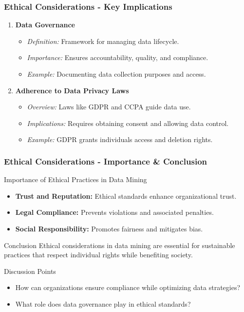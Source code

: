 \documentclass[aspectratio=169]{beamer}
\begin{document}
\begin{frame}[fragile]
    \frametitle{Ethical Considerations - Key Implications}
    \begin{enumerate}
        \item \textbf{Data Governance} 
            \begin{itemize}
                \item \textit{Definition:} Framework for managing data lifecycle.
                \item \textit{Importance:} Ensures accountability, quality, and compliance.
                \item \textit{Example:} Documenting data collection purposes and access.
            \end{itemize}
        \item \textbf{Adherence to Data Privacy Laws}
            \begin{itemize}
                \item \textit{Overview:} Laws like GDPR and CCPA guide data use.
                \item \textit{Implications:} Requires obtaining consent and allowing data control.
                \item \textit{Example:} GDPR grants individuals access and deletion rights.
            \end{itemize}
    \end{enumerate}
\end{frame}

\begin{frame}[fragile]
    \frametitle{Ethical Considerations - Importance & Conclusion}
    \begin{block}{Importance of Ethical Practices in Data Mining}
        \begin{itemize}
            \item \textbf{Trust and Reputation:} Ethical standards enhance organizational trust.
            \item \textbf{Legal Compliance:} Prevents violations and associated penalties.
            \item \textbf{Social Responsibility:} Promotes fairness and mitigates bias.
        \end{itemize}
    \end{block}
    
    \begin{block}{Conclusion}
        Ethical considerations in data mining are essential for sustainable practices that respect individual rights while benefiting society.
    \end{block}
    
    \begin{block}{Discussion Points}
        \begin{itemize}
            \item How can organizations ensure compliance while optimizing data strategies?
            \item What role does data governance play in ethical standards?
        \end{itemize}
    \end{block}
\end{frame}
\end{document}
